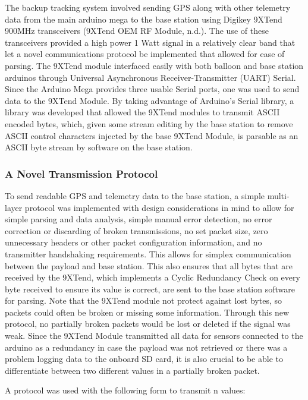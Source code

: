 \documentclass[12pt,]{article}
\begin{document}
The backup tracking system involved sending GPS along with other
telemetry data from the main arduino mega to the base station using
Digikey 9XTend 900MHz transceivers (9XTend OEM RF Module, n.d.). The use
of these transceivers provided a high power 1 Watt signal in a
relatively clear band that let a novel communications protocol be
implemented that allowed for ease of parsing. The 9XTend module
interfaced easily with both balloon and base station arduinos through
Universal Asynchronous Receiver-Transmitter (UART) Serial. Since the
Arduino Mega provides three usable Serial ports, one was used to send
data to the 9XTend Module. By taking advantage of Arduino's Serial
library, a library was developed that allowed the 9XTend modules to
transmit ASCII encoded bytes, which, given some stream editing by the
base station to remove ASCII control characters injected by the base
9XTend Module, is parsable as an ASCII byte stream by software on the
base station.

\subsubsection{A Novel Transmission
Protocol}\label{a-novel-transmission-protocol}

To send readable GPS and telemetry data to the base station, a simple
multi-layer protocol was implemented with design considerations in mind
to allow for simple parsing and data analysis, simple manual error
detection, no error correction or discarding of broken transmissions, no
set packet size, zero unnecessary headers or other packet configuration
information, and no transmitter handshaking requirements. This allows
for simplex communication between the payload and base station. This
also ensures that all bytes that are received by the 9XTend, which
implements a Cyclic Redundancy Check on every byte received to ensure
its value is correct, are sent to the base station software for parsing.
Note that the 9XTend module not protect against lost bytes, so packets
could often be broken or missing some information. Through this new
protocol, no partially broken packets would be lost or deleted if the
signal was weak. Since the 9XTend Module transmitted all data for
sensors connected to the arduino as a redundancy in case the payload was
not retrieved or there was a problem logging data to the onboard SD
card, it is also crucial to be able to differentiate between two
different values in a partially broken packet.

A protocol was used with the following form to transmit n values:
\end{document}
